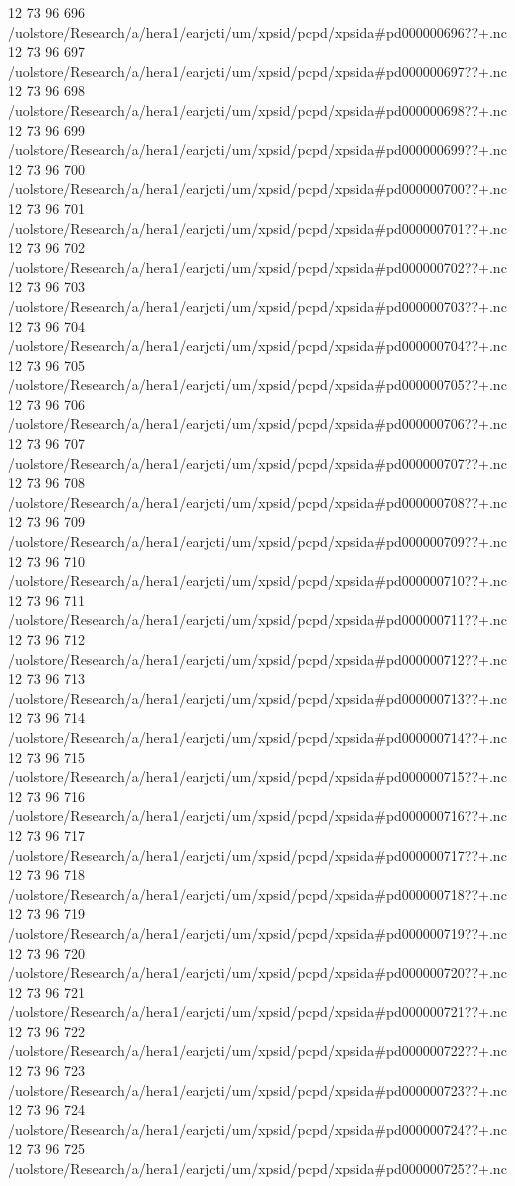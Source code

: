 12 73 96
696
/uolstore/Research/a/hera1/earjcti/um/xpsid/pcpd/xpsida#pd000000696??+.nc
12 73 96
697
/uolstore/Research/a/hera1/earjcti/um/xpsid/pcpd/xpsida#pd000000697??+.nc
12 73 96
698
/uolstore/Research/a/hera1/earjcti/um/xpsid/pcpd/xpsida#pd000000698??+.nc
12 73 96
699
/uolstore/Research/a/hera1/earjcti/um/xpsid/pcpd/xpsida#pd000000699??+.nc
12 73 96
700
/uolstore/Research/a/hera1/earjcti/um/xpsid/pcpd/xpsida#pd000000700??+.nc
12 73 96
701
/uolstore/Research/a/hera1/earjcti/um/xpsid/pcpd/xpsida#pd000000701??+.nc
12 73 96
702
/uolstore/Research/a/hera1/earjcti/um/xpsid/pcpd/xpsida#pd000000702??+.nc
12 73 96
703
/uolstore/Research/a/hera1/earjcti/um/xpsid/pcpd/xpsida#pd000000703??+.nc
12 73 96
704
/uolstore/Research/a/hera1/earjcti/um/xpsid/pcpd/xpsida#pd000000704??+.nc
12 73 96
705
/uolstore/Research/a/hera1/earjcti/um/xpsid/pcpd/xpsida#pd000000705??+.nc
12 73 96
706
/uolstore/Research/a/hera1/earjcti/um/xpsid/pcpd/xpsida#pd000000706??+.nc
12 73 96
707
/uolstore/Research/a/hera1/earjcti/um/xpsid/pcpd/xpsida#pd000000707??+.nc
12 73 96
708
/uolstore/Research/a/hera1/earjcti/um/xpsid/pcpd/xpsida#pd000000708??+.nc
12 73 96
709
/uolstore/Research/a/hera1/earjcti/um/xpsid/pcpd/xpsida#pd000000709??+.nc
12 73 96
710
/uolstore/Research/a/hera1/earjcti/um/xpsid/pcpd/xpsida#pd000000710??+.nc
12 73 96
711
/uolstore/Research/a/hera1/earjcti/um/xpsid/pcpd/xpsida#pd000000711??+.nc
12 73 96
712
/uolstore/Research/a/hera1/earjcti/um/xpsid/pcpd/xpsida#pd000000712??+.nc
12 73 96
713
/uolstore/Research/a/hera1/earjcti/um/xpsid/pcpd/xpsida#pd000000713??+.nc
12 73 96
714
/uolstore/Research/a/hera1/earjcti/um/xpsid/pcpd/xpsida#pd000000714??+.nc
12 73 96
715
/uolstore/Research/a/hera1/earjcti/um/xpsid/pcpd/xpsida#pd000000715??+.nc
12 73 96
716
/uolstore/Research/a/hera1/earjcti/um/xpsid/pcpd/xpsida#pd000000716??+.nc
12 73 96
717
/uolstore/Research/a/hera1/earjcti/um/xpsid/pcpd/xpsida#pd000000717??+.nc
12 73 96
718
/uolstore/Research/a/hera1/earjcti/um/xpsid/pcpd/xpsida#pd000000718??+.nc
12 73 96
719
/uolstore/Research/a/hera1/earjcti/um/xpsid/pcpd/xpsida#pd000000719??+.nc
12 73 96
720
/uolstore/Research/a/hera1/earjcti/um/xpsid/pcpd/xpsida#pd000000720??+.nc
12 73 96
721
/uolstore/Research/a/hera1/earjcti/um/xpsid/pcpd/xpsida#pd000000721??+.nc
12 73 96
722
/uolstore/Research/a/hera1/earjcti/um/xpsid/pcpd/xpsida#pd000000722??+.nc
12 73 96
723
/uolstore/Research/a/hera1/earjcti/um/xpsid/pcpd/xpsida#pd000000723??+.nc
12 73 96
724
/uolstore/Research/a/hera1/earjcti/um/xpsid/pcpd/xpsida#pd000000724??+.nc
12 73 96
725
/uolstore/Research/a/hera1/earjcti/um/xpsid/pcpd/xpsida#pd000000725??+.nc
